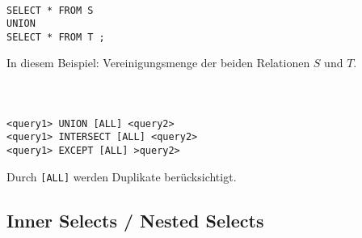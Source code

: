 \begin{frame}[fragile]\frametitle{\insertsection}
\framesubtitle{\insertsubsection}
\\[4pt]
\begin{lstlisting}[xleftmargin=3ex]
SELECT * FROM S
UNION
SELECT * FROM T ;
\end{lstlisting}
\abs
In diesem Beispiel: Vereinigungsmenge der beiden Relationen $S$ und $T$. 
\end{frame}

\begin{frame}[fragile]\frametitle{\insertsection}
\framesubtitle{\insertsubsection}
\onslide
{}\\[4pt]
\begin{lstlisting}[xleftmargin=3ex]
<query1> UNION [ALL] <query2>
<query1> INTERSECT [ALL] <query2>
<query1> EXCEPT [ALL] >query2>
\end{lstlisting}
\abs
Durch \texttt{[ALL]} werden Duplikate berücksichtigt.
\end{frame}

\subsection{Inner Selects / Nested Selects}

